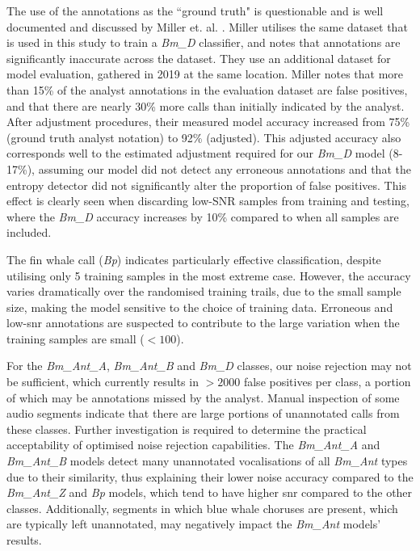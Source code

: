 {The use of the annotations as the ``ground truth" is questionable and is well documented and discussed by Miller et. al. \citep{casey2019}. Miller utilises the same dataset that is used in this study to train a \textit{Bm\_D} classifier, and notes that annotations are significantly inaccurate across the dataset. They use an additional dataset for model evaluation, gathered in 2019 at the same location. Miller notes that more than 15\% of the analyst annotations in the evaluation dataset are false positives, and that there are nearly 30\% more calls than initially indicated by the analyst. After adjustment procedures, their measured model accuracy increased from 75\% (ground truth analyst notation) to 92\% (adjusted). This adjusted accuracy also corresponds well to the estimated adjustment required for our \textit{Bm\_D} model (8-17\%), assuming our model did not detect any erroneous annotations and that the entropy detector did not significantly alter the proportion of false positives. This effect is clearly seen when discarding low-SNR samples from training and testing, where the \textit{Bm\_D} accuracy increases by 10\% compared to when all samples are included.

The fin whale call (\textit{Bp}) indicates particularly effective classification, despite utilising only 5 training samples in the most extreme case. However, the accuracy varies dramatically over the randomised training trails, due to the small sample size, making the model sensitive to the choice of training data. Erroneous and low-\ac{snr} annotations are suspected to contribute to the large variation when the training samples are small ($<100$).

For the \textit{Bm\_Ant\_A}, \textit{Bm\_Ant\_B} and \textit{Bm\_D} classes, our noise rejection may not be sufficient, which currently results in $>2000$ false positives per class, a portion of which may be annotations missed by the analyst. Manual inspection of some audio segments indicate that there are large portions of unannotated calls from these classes. Further investigation is required to determine the practical acceptability of optimised noise rejection capabilities. The \textit{Bm\_Ant\_A} and \textit{Bm\_Ant\_B} models detect many unannotated vocalisations of all \textit{Bm\_Ant} types due to their similarity, thus explaining their lower noise accuracy compared to the \textit{Bm\_Ant\_Z} and \textit{Bp} models, which tend to have higher \ac{snr} compared to the other classes. Additionally, segments in which blue whale choruses are present, which are typically left unannotated, may negatively impact the \textit{Bm\_Ant} models' results.

}
